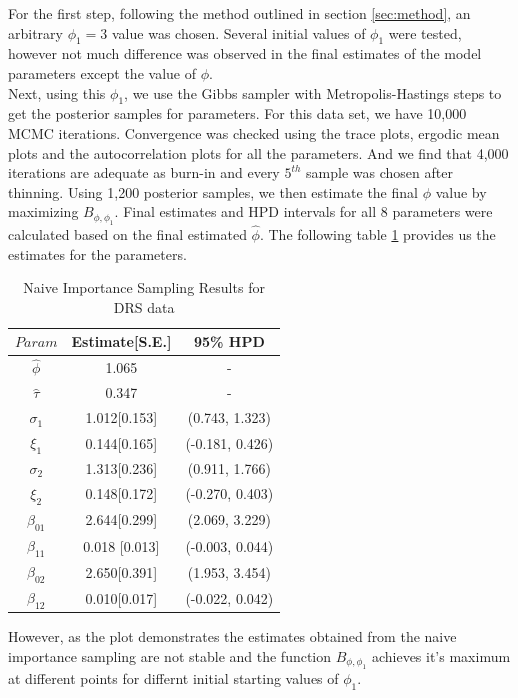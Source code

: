 \documentclass[11pt]{article}
\theoremstyle{remboldstyle}
\begin{document}
For the first step, following the method outlined in section \ref{sec:method}, an arbitrary $\phi_1 = 3$ value was chosen. Several initial values of $\phi_1$ were tested, however not much difference was observed in the final estimates of the model parameters except the value of $\phi$. \\
Next, using this $\phi_1$, we use the Gibbs sampler with Metropolis-Hastings steps to get the posterior samples for parameters. For this data set, we have 10,000 MCMC iterations. Convergence was checked using the trace plots, ergodic mean plots and the autocorrelation plots for all the parameters. And we find that 4,000 iterations are adequate as burn-in and every $5^{th}$ sample was chosen after thinning. Using 1,200 posterior samples, we then estimate the final $\phi$ value by maximizing $B_{\phi, \phi_1}$. Final estimates and HPD intervals for all 8 parameters were calculated based on the final estimated $\hat{\phi}$. The following table \ref{tab3} provides us the estimates for the parameters.
\begin{table}[h]
\caption{Naive Importance Sampling Results for DRS data}
\centering
\begin{tabular}{c c c}
\hline
$Param$      & Estimate[S.E.] & 95\% HPD\\
\hline
$\hat{\phi}$ & 1.065              & -\\
$\hat{\tau}$ & 0.347              & -\\
$\sigma_1$      & 1.012[0.153]        & (0.743, 1.323)\\   
$\xi_1$      & 0.144[0.165]        & (-0.181, 0.426)\\
$\sigma_2$ & 1.313[0.236]              & (0.911, 1.766)\\
$\xi_2$      & 0.148[0.172]        & (-0.270, 0.403)\\   
$\beta_{01}$      & 2.644[0.299]        & (2.069, 3.229)\\
$\beta_{11}$ & 0.018 [0.013]             & (-0.003, 0.044)\\
$\beta_{02}$      & 2.650[0.391]        & (1.953, 3.454)\\   
$\beta_{12}$      & 0.010[0.017]        & (-0.022, 0.042)\\
 \hline             
\end{tabular}
\label{tab3}
\end{table}
\noindent
However, as the plot demonstrates the estimates obtained from the naive importance sampling are not stable and the function $B_{\phi, \phi_1}$ achieves it's maximum at different points for differnt initial starting values of $\phi_1$. \\
\end{document}
